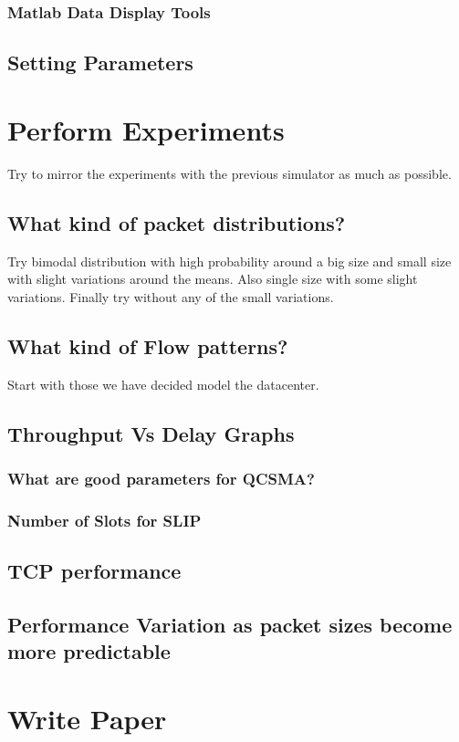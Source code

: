 \documentclass{IEEEtran}%
\begin{document}
\subsubsection{Matlab Data Display Tools}
\subsection{Setting Parameters}


\section{Perform Experiments}

Try to mirror the experiments with the previous simulator as much as possible.
\subsection{What kind of packet distributions?}
Try bimodal distribution with high probability around a big size and small size with slight variations around the means.  Also single size with some slight variations.  Finally try without any of the small variations.
\subsection{What kind of Flow patterns?}
Start with those we have decided model the datacenter.
\subsection{Throughput Vs Delay Graphs}
\subsubsection{What are good parameters for QCSMA?}
\subsubsection{Number of Slots for SLIP}
\subsection{TCP performance}
\subsection{Performance Variation as packet sizes become more predictable}

\section{Write Paper}
\end{document}
